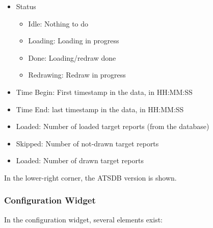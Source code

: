 \begin{itemize}
 \item Status
\begin{itemize}
 \item Idle: Nothing to do
 \item Loading: Loading in progress
 \item Done: Loading/redraw done
 \item Redrawing: Redraw in progress
\end{itemize}
 \item Time Begin: First timestamp in the data, in HH:MM:SS
 \item Time End: last timestamp in the data, in HH:MM:SS
 \item Loaded: Number of loaded target reports (from the database)
 \item Skipped: Number of not-drawn target reports
 \item Loaded: Number of drawn target reports
\end{itemize}

In the lower-right corner, the ATSDB version is shown.

\subsubsection{Configuration Widget}
\label{sec:osgview_config}

In the configuration widget, several elements exist:

